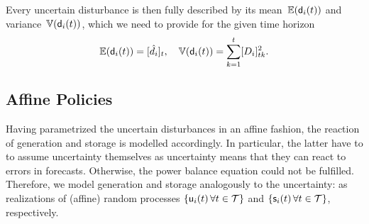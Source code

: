 \documentclass[final,3p,times,twocolumn]{elsarticle}  %
\begin{document}
Every uncertain disturbance is then fully described by its mean~$\mathbb{E}(\mathsf{d}_i(t))$ and variance~$\mathbb{V}(\mathsf{d}_i(t))$, which we need to provide for the given time horizon
\begin{equation}
\label{eq:MeanVariance_Load}
\ev{\rv\load_i(t)} = [ \hat\load_i ]_t, \quad
\var{\rv\load_i(t)} = \sum_{k=1}^{t} [\Load_i]_{tk}^2.
\end{equation}



\subsection{Affine Policies}%

Having parametrized the uncertain disturbances in an affine fashion, the reaction of generation and storage is modelled accordingly. In particular, the latter have to to assume uncertainty themselves as uncertainty means that they can react to errors in forecasts. Otherwise, the power balance equation could not be fulfilled. Therefore, we model generation and storage analogously to the uncertainty: as realizations of (affine) random processes $\{ \mathsf{u}_i(t) \, \forall t \in \mathcal{T} \}$ and $\{ \mathsf{s}_i(t) \, \forall t \in \mathcal{T} \}$, respectively.
\end{document}
